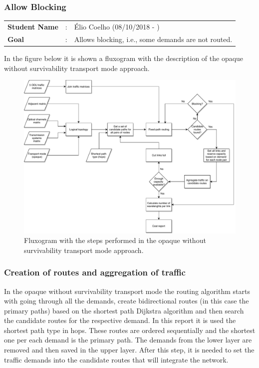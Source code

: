 \subsubsection{Allow Blocking}

\begin{tcolorbox}	
	\begin{tabular}{p{2.75cm} p{0.2cm} p{10.5cm}} 	
		\textbf{Student Name}   &:& \'Elio Coelho    (08/10/2018 - )\\
		\textbf{Goal}           &:& Allows blocking, i.e., some demands are not routed.
	\end{tabular}
\end{tcolorbox}

\vspace{13pt}

In the figure below it is shown a fluxogram with the description of the opaque without survivability transport mode approach.

\begin{figure}[H]
	\centering
	\includegraphics[width=16cm]{sdf/heuristic/opaque_survivability/figures/Opaque_Diagram}
	\caption{Fluxogram with the steps performed in the opaque without survivability transport mode approach.}
	\label{fluxogram_opaque_surv}
\end{figure}

\subsubsection{Creation of routes and aggregation of traffic}

\vspace{11pt}
In the opaque without survivability transport mode the routing algorithm starts with going through all the demands, create bidirectional routes (in this case the primary paths) based on the shortest path Dijkstra algorithm and then search the candidate routes for the respective demand. In this report it is used the shortest path type in hops. These routes are ordered sequentially and the shortest one per each demand is the primary path. The demands from the lower layer are removed and then saved in the upper layer. After this step, it is needed to set the traffic demands into the candidate routes that will integrate the network.

